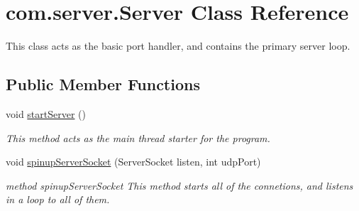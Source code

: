 \hypertarget{classcom_1_1server_1_1Server}{\section{com.\-server.\-Server Class Reference}
\label{classcom_1_1server_1_1Server}
}


This class acts as the basic port handler, and contains the primary server loop.  


\subsection*{Public Member Functions}
\begin{DoxyCompactItemize}
\item 
void \hyperlink{classcom_1_1server_1_1Server_a673471b8c62caeb3e6058293f309da4f}{start\-Server} ()
\begin{DoxyCompactList}\small\item\em This method acts as the main thread starter for the program. \end{DoxyCompactList}\item 
\hypertarget{classcom_1_1server_1_1Server_a534f1955b0d607422970e36f674435ce}{void \hyperlink{classcom_1_1server_1_1Server_a534f1955b0d607422970e36f674435ce}{spinup\-Server\-Socket} (Server\-Socket listen, int udp\-Port)}\label{classcom_1_1server_1_1Server_a534f1955b0d607422970e36f674435ce}

\begin{DoxyCompactList}\small\item\em method spinup\-Server\-Socket This method starts all of the connetions, and listens in a loop to all of them. \end{DoxyCompactList}\end{DoxyCompactItemize}
